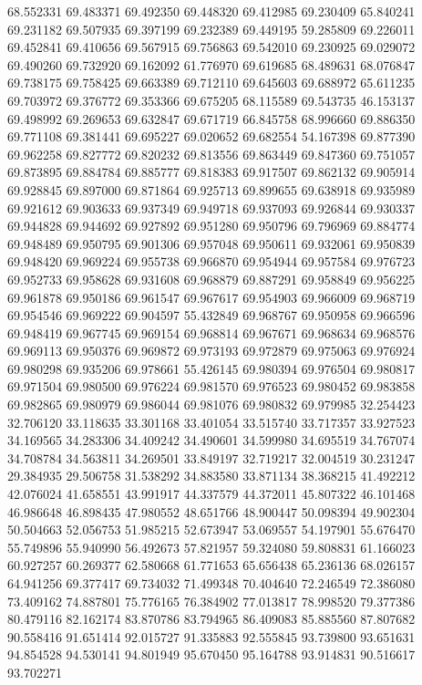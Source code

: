 68.552331
69.483371
69.492350
69.448320
69.412985
69.230409
65.840241
69.231182
69.507935
69.397199
69.232389
69.449195
59.285809
69.226011
69.452841
69.410656
69.567915
69.756863
69.542010
69.230925
69.029072
69.490260
69.732920
69.162092
61.776970
69.619685
68.489631
68.076847
69.738175
69.758425
69.663389
69.712110
69.645603
69.688972
65.611235
69.703972
69.376772
69.353366
69.675205
68.115589
69.543735
46.153137
69.498992
69.269653
69.632847
69.671719
66.845758
68.996660
69.886350
69.771108
69.381441
69.695227
69.020652
69.682554
54.167398
69.877390
69.962258
69.827772
69.820232
69.813556
69.863449
69.847360
69.751057
69.873895
69.884784
69.885777
69.818383
69.917507
69.862132
69.905914
69.928845
69.897000
69.871864
69.925713
69.899655
69.638918
69.935989
69.921612
69.903633
69.937349
69.949718
69.937093
69.926844
69.930337
69.944828
69.944692
69.927892
69.951280
69.950796
69.796969
69.884774
69.948489
69.950795
69.901306
69.957048
69.950611
69.932061
69.950839
69.948420
69.969224
69.955738
69.966870
69.954944
69.957584
69.976723
69.952733
69.958628
69.931608
69.968879
69.887291
69.958849
69.956225
69.961878
69.950186
69.961547
69.967617
69.954903
69.966009
69.968719
69.954546
69.969222
69.904597
55.432849
69.968767
69.950958
69.966596
69.948419
69.967745
69.969154
69.968814
69.967671
69.968634
69.968576
69.969113
69.950376
69.969872
69.973193
69.972879
69.975063
69.976924
69.980298
69.935206
69.978661
55.426145
69.980394
69.976504
69.980817
69.971504
69.980500
69.976224
69.981570
69.976523
69.980452
69.983858
69.982865
69.980979
69.986044
69.981076
69.980832
69.979985
32.254423
32.706120
33.118635
33.301168
33.401054
33.515740
33.717357
33.927523
34.169565
34.283306
34.409242
34.490601
34.599980
34.695519
34.767074
34.708784
34.563811
34.269501
33.849197
32.719217
32.004519
30.231247
29.384935
29.506758
31.538292
34.883580
33.871134
38.368215
41.492212
42.076024
41.658551
43.991917
44.337579
44.372011
45.807322
46.101468
46.986648
46.898435
47.980552
48.651766
48.900447
50.098394
49.902304
50.504663
52.056753
51.985215
52.673947
53.069557
54.197901
55.676470
55.749896
55.940990
56.492673
57.821957
59.324080
59.808831
61.166023
60.927257
60.269377
62.580668
61.771653
65.656438
65.236136
68.026157
64.941256
69.377417
69.734032
71.499348
70.404640
72.246549
72.386080
73.409162
74.887801
75.776165
76.384902
77.013817
78.998520
79.377386
80.479116
82.162174
83.870786
83.794965
86.409083
85.885560
87.807682
90.558416
91.651414
92.015727
91.335883
92.555845
93.739800
93.651631
94.854528
94.530141
94.801949
95.670450
95.164788
93.914831
90.516617
93.702271
